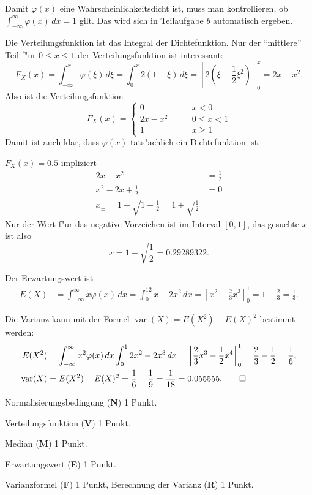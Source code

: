 \begin{loesung}
\begin{teilaufgaben}
\item Damit $\varphi(x)$ eine Wahrscheinlichkeitsdicht ist, muss man 
kontrollieren, ob $\int_{-\infty}^\infty\varphi(x)\,dx=1$ gilt. Das
wird sich in Teilaufgabe $b$ automatisch ergeben.
\item Die Verteilungsfunktion ist das Integral der Dichtefunktion.
Nur der ``mittlere'' Teil f"ur $0\le x\le 1$
der Verteilungsfunktion ist interessant:
\[
F_X(x)=\int_{-\infty}^x\varphi(\xi)\,d\xi =\int_0^x2(1-\xi)\,d\xi=
\left[2(\xi-\frac12\xi^2)\right]_0^x=2x-x^2.
\]
Also ist die Verteilungsfunktion
\[
F_X(x)=\begin{cases}
     0&\qquad x < 0\\
2x-x^2&\qquad 0\le x < 1\\
     1&\qquad x \ge 1
\end{cases}
\]
Damit ist auch klar, dass $\varphi(x)$ tats"achlich ein Dichtefunktion ist.
\item $F_X(x)=0.5$ impliziert
\begin{align*}
2x-x^2&=\frac12\\
x^2-2x+\frac12&=0\\
x_\pm=1\pm\sqrt{1-\frac12}=1\pm\sqrt{\frac12}
\end{align*}
Nur der Wert f"ur das negative Vorzeichen ist im Interval $[0,1]$, das gesuchte
$x$ ist also
\[
x=1-\sqrt{\frac12}=0.29289322.
\]
\item
Der Erwartungswert ist
\begin{align*}
E(X)&=\int_{-\infty}^{\infty}x\varphi(x)\,dx
=\int_0^12x-2x^2\,dx=\left[ x^2-\frac23x^3\right]_0^1=1-\frac23=\frac13.
\end{align*}
\item Die Varianz kann mit der Formel
$\operatorname{var}(X)=E(X^2)-E(X)^2$ bestimmt werden:
\begin{align*}
E(X^2)&=\int_{-\infty}^{\infty}x^2\varphi(x)\,dx
\int_0^1 2x^2-2x^3\,dx
=\left[\frac23x^3-\frac12x^4\right]_0^1
=\frac23-\frac12=\frac16,
\\
\operatorname{var}(X)&=E(X^2)-E(X)^2=\frac16 - \frac19=\frac1{18}=0.055555.
\qedhere
\end{align*}
\end{teilaufgaben}
\end{loesung}

\begin{bewertung}
\begin{teilaufgaben}
\item Normalisierungsbedingung ({\bf N}) 1 Punkt.
\item Verteilungsfunktion ({\bf V}) 1 Punkt.
\item Median ({\bf M}) 1 Punkt.
\item Erwartungswert ({\bf E}) 1 Punkt.
\item Varianzformel ({\bf F}) 1 Punkt, Berechnung der Varianz ({\bf R}) 1 Punkt.
\end{teilaufgaben}
\end{bewertung}

